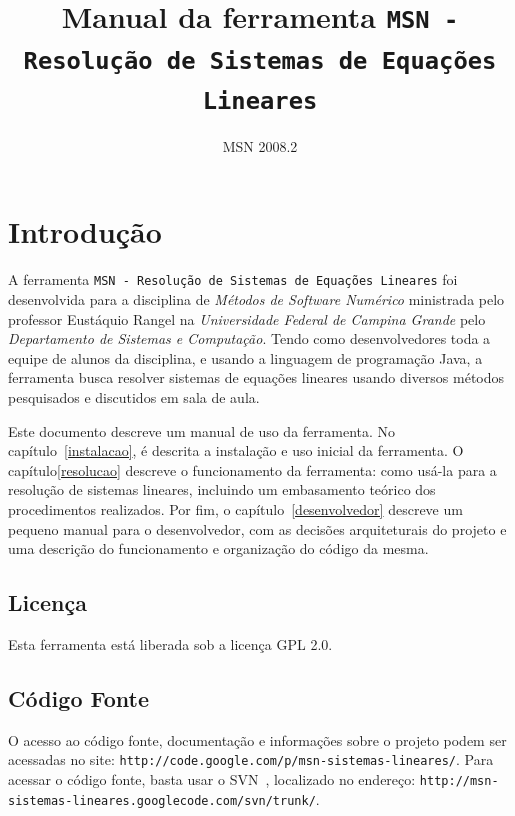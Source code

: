 \documentclass[a4paper,10pt]{report}
\newcommand{\ferramenta}{\texttt{MSN - Resolução de Sistemas de Equações Lineares}\xspace}
\begin{document}
\title{Manual da ferramenta \ferramenta}
\author{MSN 2008.2}



\maketitle

\tableofcontents

\chapter{Introdução}
\label{intro}

A ferramenta \ferramenta foi desenvolvida para a disciplina de \textit{Métodos de Software Numérico} ministrada pelo professor Eustáquio Rangel na \textit{Universidade Federal de Campina Grande} pelo \textit{Departamento de Sistemas e Computação}. Tendo como desenvolvedores toda a equipe de alunos da disciplina, e usando a linguagem de programação Java, a ferramenta busca resolver sistemas de equações lineares usando diversos métodos pesquisados e discutidos em sala de aula.

Este documento descreve um manual de uso da ferramenta. No capítulo~\ref{instalacao}, é descrita a instalação e uso inicial da ferramenta. O capítulo\ref{resolucao} descreve o funcionamento da ferramenta: como usá-la para a resolução de sistemas lineares, incluindo um embasamento teórico dos procedimentos realizados. Por fim, o capítulo~\ref{desenvolvedor} descreve um pequeno manual para o desenvolvedor, com as decisões arquiteturais do projeto e uma descrição do funcionamento e organização do código da mesma.

\section{Licença}

Esta ferramenta está liberada sob a licença GPL 2.0\cite{gpl}.

\section{Código Fonte}

O acesso ao código fonte, documentação e informações sobre o projeto podem ser acessadas no site: \texttt{http://code.google.com/p/msn-sistemas-lineares/}. Para acessar o código fonte, basta usar o SVN~\cite{svn}, localizado no endereço: \texttt{http://msn-sistemas-lineares.googlecode.com/svn/trunk/}.
\end{document}
